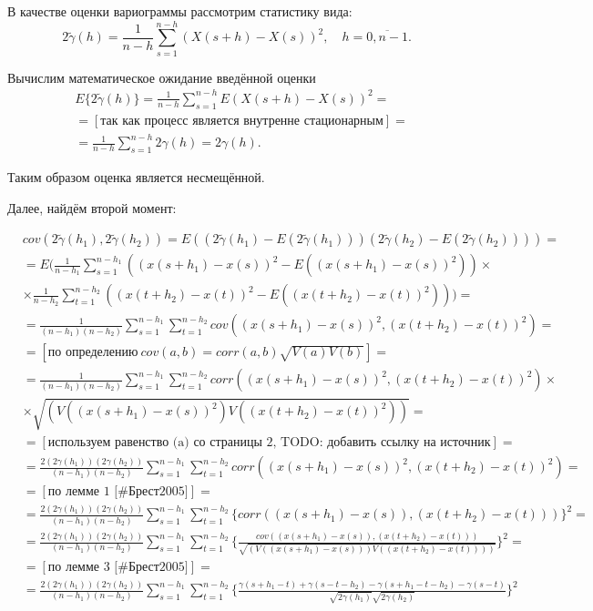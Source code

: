 \documentclass[a4paper]{article}
\begin{document}
В качестве оценки вариограммы рассмотрим статистику вида:
\begin{equation}
	\label{eq:var_est}
	2 \tilde{\gamma}(h) = \frac{1}{n-h} \sum_{s=1}^{n-h}(X(s+h) - X(s))^2, \quad h = \overline{0, n-1}.
\end{equation}

Вычислим математическое ожидание введённой оценки %
\begin{eqnarray*}
	& E \{ 2 \tilde{\gamma}(h) \} = \frac{1}{n-h} \sum_{s=1}^{n-h} E(X(s+h) - X(s))^2 = \\
	& = [\text{так как процесс является внутренне стационарным}] = \\
	& = \frac{1}{n-h} \sum_{s=1}^{n-h} 2 \gamma(h) = 2 \gamma(h).
\end{eqnarray*}

Таким образом оценка является несмещённой.

Далее, найдём второй момент:

\begin{eqnarray*}
	& cov(2 \tilde{\gamma}(h_1), 2 \tilde{\gamma}(h_2)) = E((2 \tilde{\gamma}(h_1) - E(2 \tilde{\gamma}(h_1))) (2 \tilde{\gamma}(h_2) - E(2 \tilde{\gamma}(h_2)))) = \\
	& = E(\frac{1}{n-h_1} \sum_{s=1}^{n-h_1}((x(s+h_1) - x(s))^2 - E((x(s+h_1) - x(s))^2)) \times \\
	& \times \frac{1}{n-h_2} \sum_{t=1}^{n-h_2}((x(t+h_2) - x(t))^2 - E((x(t+h_2) - x(t))^2))) = \\
	& = \frac{1}{(n-h_1)(n-h_2)}\sum_{s=1}^{n-h_1}\sum_{t=1}^{n-h_2} cov((x(s+h_1) - x(s))^2, (x(t+h_2) - x(t))^2) = \\
	& = [\text{по определению} ~ cov(a,b) = corr(a,b)\sqrt{V(a)V(b)}] = \\
	& = \frac{1}{(n-h_1)(n-h_2)}\sum_{s=1}^{n-h_1}\sum_{t=1}^{n-h_2} corr((x(s+h_1) - x(s))^2, (x(t+h_2) - x(t))^2) \times \\
	& \times \sqrt{(V((x(s+h_1) - x(s))^2) V((x(t+h_2) - x(t))^2))} = \\
	& = [\text{используем равенство (a) со страницы 2, TODO: добавить ссылку на источник}] = \\
	& = \frac{2 (2\gamma(h_1))(2\gamma(h_2))}{(n-h_1)(n-h_2)}\sum_{s=1}^{n-h_1}\sum_{t=1}^{n-h_2} corr((x(s+h_1) - x(s))^2, (x(t+h_2) - x(t))^2) = \\
	& = [\text{по лемме 1 [\#Брест2005]}] = \\
	& = \frac{2 (2\gamma(h_1))(2\gamma(h_2))}{(n-h_1)(n-h_2)}\sum_{s=1}^{n-h_1}\sum_{t=1}^{n-h_2} \{corr((x(s+h_1) - x(s)), (x(t+h_2) - x(t))) \}^2 = \\
	& = \frac{2 (2\gamma(h_1))(2\gamma(h_2))}{(n-h_1)(n-h_2)}\sum_{s=1}^{n-h_1}\sum_{t=1}^{n-h_2} \{\frac{cov((x(s+h_1) - x(s)), (x(t+h_2) - x(t)))}{\sqrt{(V((x(s+h_1) - x(s))) V((x(t+h_2) - x(t))))}} \}^2 = \\
	& = [\text{по лемме 3 [\#Брест2005]}] = \\
	& = \frac{2 (2\gamma(h_1))(2\gamma(h_2))}{(n-h_1)(n-h_2)}\sum_{s=1}^{n-h_1}\sum_{t=1}^{n-h_2} \{\frac{\gamma(s+h_1-t) + \gamma(s-t-h_2) - \gamma(s+h_1-t-h_2) - \gamma(s-t)}{\sqrt{2 \gamma(h_1)} \sqrt{2 \gamma(h_2)}} \}^2
\end{eqnarray*}
\end{document}
